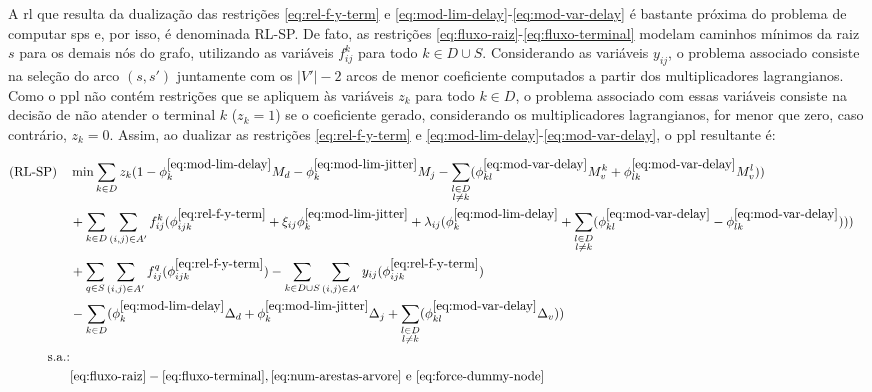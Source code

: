 A \gls{rl}  que resulta da  dualização das restrições  \eqref{eq:rel-f-y-term} e
\eqref{eq:mod-lim-delay}-\eqref{eq:mod-var-delay} é bastante próxima do problema
de computar  \gls{sp}s e, por isso,  é denominada RL-SP. De  fato, as restrições
\eqref{eq:fluxo-raiz}-\eqref{eq:fluxo-terminal} modelam caminhos mínimos da raiz
$s$ para os demais nós do  grafo, utilizando as variáveis $f_{ij}^{k}$ para todo
$k  \in D  \cup S$.  Considerando as  variáveis $y_{ij}$,  o problema  associado
consiste na seleção do arco $(s, s')$  juntamente com os $|V'|-2$ arcos de menor
coeficiente  computados  a  partir  dos  multiplicadores  lagrangianos.  Como  o
\gls{ppl} não contém restrições que se  apliquem às variáveis $z_k$ para todo $k
\in D$,  o problema  associado com  essas variáveis consiste  na decisão  de não
atender o  terminal $k$  ($z_k =  1$) se o  coeficiente gerado,  considerando os
multiplicadores lagrangianos,  for menor  que zero, caso  contrário, $z_k  = 0$.
Assim,     ao    dualizar     as     restrições    \eqref{eq:rel-f-y-term}     e
\eqref{eq:mod-lim-delay}-\eqref{eq:mod-var-delay}, o \gls{ppl} resultante é:

\begin{align}
\text{(RL-SP)} \quad 
    & \nonumber \displaystyle \min \sum_{k \in D}z_k (1 - \phi^{\ref{eq:mod-lim-delay}}_{k}M_d - \phi^{\ref{eq:mod-lim-jitter}}_{k}M_j - \sum_{\substack{l \in D \\ l \neq k}}(\phi^{\ref{eq:mod-var-delay}}_{kl}M_v^k + \phi^{\ref{eq:mod-var-delay}}_{lk}M_v^l)) & \\ 
    & \nonumber \displaystyle + \sum_{k \in D} \sum_{(i, j) \in A'} f_{ij}^{k} (\phi^{\ref{eq:rel-f-y-term}}_{ijk} + \xi_{ij} \phi^{\ref{eq:mod-lim-jitter}}_{k} + \lambda_{ij} (\phi^{\ref{eq:mod-lim-delay}}_{k} + \sum_{\substack{l \in D \\ l \neq k}} (\phi^{\ref{eq:mod-var-delay}}_{kl} - \phi^{\ref{eq:mod-var-delay}}_{lk}) ) ) & \\
    & \nonumber \displaystyle + \sum_{q \in S} \sum_{(i, j) \in A'} f_{ij}^{q}(\phi^{
    \ref{eq:rel-f-y-term}}_{ijk}) - \sum_{k \in D \cup S} \sum_{(i, j) \in A'} y_{ij}(\phi^{\ref{eq:rel-f-y-term}}_{ijk}) & \\ 
    & \displaystyle - \sum_{k \in D} (\phi^{\ref{eq:mod-lim-delay}}_{k} \Delta_d + \phi^{\ref{eq:mod-lim-jitter}}_{k} \Delta_j + \sum_{\substack{l \in D \\ l \neq k}}(\phi^{\ref{eq:mod-var-delay}}_{kl} \Delta_v)) & \label{eq:fo-rlsp} \\
\nonumber \text{s.a.:} \\ \quad
    & \nonumber \eqref{eq:fluxo-raiz}-\eqref{eq:fluxo-terminal}, \eqref{eq:num-arestas-arvore} \text{ e } \eqref{eq:force-dummy-node}  & 
\end{align}

